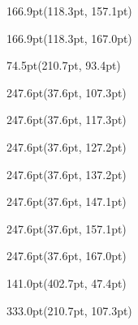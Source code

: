 \documentclass{article}
\begin{document}
\begin{textblock*}{166.9pt}(118.3pt, 157.1pt)%
\noindent%
%
\end{textblock*}
\begin{textblock*}{166.9pt}(118.3pt, 167.0pt)%
\noindent%
%
\end{textblock*}
\begin{textblock*}{74.5pt}(210.7pt, 93.4pt)%
\noindent%
%
\end{textblock*}
\begin{textblock*}{247.6pt}(37.6pt, 107.3pt)%
\noindent%
%
\end{textblock*}
\begin{textblock*}{247.6pt}(37.6pt, 117.3pt)%
\noindent%
%
\end{textblock*}
\begin{textblock*}{247.6pt}(37.6pt, 127.2pt)%
\noindent%
%
\end{textblock*}
\begin{textblock*}{247.6pt}(37.6pt, 137.2pt)%
\noindent%
%
\end{textblock*}
\begin{textblock*}{247.6pt}(37.6pt, 147.1pt)%
\noindent%
%
\end{textblock*}
\begin{textblock*}{247.6pt}(37.6pt, 157.1pt)%
\noindent%
%
\end{textblock*}
\begin{textblock*}{247.6pt}(37.6pt, 167.0pt)%
\noindent%
%
\end{textblock*}
\begin{textblock*}{141.0pt}(402.7pt, 47.4pt)%
\noindent%
%
\end{textblock*}
\begin{textblock*}{333.0pt}(210.7pt, 107.3pt)%
\noindent%
%
\end{textblock*}
\end{document}
